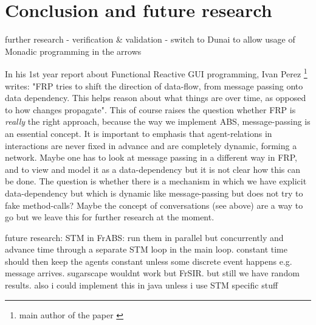 \section{Conclusion and future research}

further research
	- verification \& validation
	- switch to Dunai to allow usage of Monadic programming in the arrows
	
	
In his 1st year report about Functional Reactive GUI programming, Ivan Perez \footnote{main author of the paper \cite{perez_functional_2016}} writes: "FRP tries to shift the direction of data-flow, from message passing onto data dependency. This helps reason about what things are over time, as opposed to how changes propagate". This of course raises the question whether FRP is \textit{really} the right approach, because the way we implement ABS, message-passing is an essential concept. It is important to emphasis that agent-relations in interactions are never fixed in advance and are completely dynamic, forming a network. Maybe one has to look at message passing in a different way in FRP, and to view and model it as a data-dependency but it is not clear how this can be done. The question is whether there is a mechanism in which we have explicit data-dependency but which is dynamic like message-passing but does not try to fake method-calls? Maybe the concept of conversations (see above) are a way to go but we leave this for further research at the moment.


future research: STM in FrABS: run them in parallel but concurrently and advance time through a separate STM loop in the main loop. constant time should then keep the agents constant unless some discrete event happens e.g. message arrives. sugarscape wouldnt work but FrSIR. but still we have random results. also i could implement this in java unless i use STM specific stuff